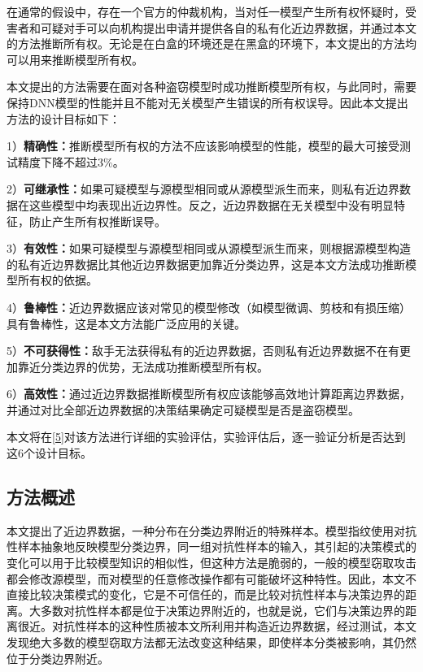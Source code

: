 在通常的假设中，存在一个官方的仲裁机构，当对任一模型产生所有权怀疑时，受害者和可疑对手可以向机构提出申请并提供各自的私有化近边界数据，并通过本文的方法推断所有权。无论是在白盒的环境还是在黑盒的环境下，本文提出的方法均可以用来推断模型所有权。

本文提出的方法需要在面对各种盗窃模型时成功推断模型所有权，与此同时，需要保持DNN模型的性能并且不能对无关模型产生错误的所有权误导。因此本文提出方法的设计目标如下：

1）\textbf{精确性：}推断模型所有权的方法不应该影响模型的性能，模型的最大可接受测试精度下降不超过3\%。

2）\textbf{可继承性：}如果可疑模型与源模型相同或从源模型派生而来，则私有近边界数据在这些模型中均表现出近边界性。反之，近边界数据在无关模型中没有明显特征，防止产生所有权推断误导。

3）\textbf{有效性：}如果可疑模型与源模型相同或从源模型派生而来，则根据源模型构造的私有近边界数据比其他近边界数据更加靠近分类边界，这是本文方法成功推断模型所有权的依据。

4）\textbf{鲁棒性：}近边界数据应该对常见的模型修改（如模型微调、剪枝和有损压缩）具有鲁棒性，这是本文方法能广泛应用的关键。

5）\textbf{不可获得性：}敌手无法获得私有的近边界数据，否则私有近边界数据不在有更加靠近分类边界的优势，无法成功推断模型所有权。

6）\textbf{高效性：}通过近边界数据推断模型所有权应该能够高效地计算距离边界数据，并通过对比全部近边界数据的决策结果确定可疑模型是否是盗窃模型。

本文将在\ref{5}对该方法进行详细的实验评估，实验评估后，逐一验证分析是否达到这6个设计目标。

\subsection{方法概述}

本文提出了近边界数据，一种分布在分类边界附近的特殊样本。模型指纹使用对抗性样本抽象地反映模型分类边界，同一组对抗性样本的输入，其引起的决策模式的变化可以用于比较模型知识的相似性，但这种方法是脆弱的，一般的模型窃取攻击都会修改源模型，而对模型的任意修改操作都有可能破坏这种特性。因此，本文不直接比较决策模式的变化，它是不可信任的，而是比较对抗性样本与决策边界的距离。大多数对抗性样本都是位于决策边界附近的，也就是说，它们与决策边界的距离很近。对抗性样本的这种性质被本文所利用并构造近边界数据，经过测试，本文发现绝大多数的模型窃取方法都无法改变这种结果，即使样本分类被影响，其仍然位于分类边界附近。


